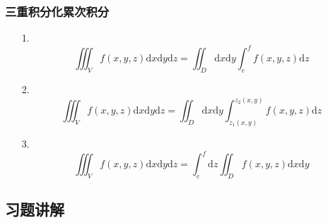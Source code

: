\documentclass[xetex]{beamer}
\begin{document}
	\begin{frame}
		\frametitle{三重积分化累次积分}
		\begin{itemize}
			\item[1.] 
				\begin{equation*}
					\iiint_{V} f(x,y,z)\mathrm{d} x \mathrm{d} y\mathrm{d} z = \iint_D \mathrm{d}x \mathrm{d} y \int_{e}^{f} f(x,y,z) \mathrm{d} z
				\end{equation*}
			\item[2.]
				\begin{equation*}
					\iiint_{V} f(x,y,z)\mathrm{d} x \mathrm{d} y\mathrm{d} z = \iint_D \mathrm{d}x \mathrm{d} y \int_{z_1(x, y)}^{z_2(x, y)} f(x,y,z) \mathrm{d} z
				\end{equation*}
			\item[3.]
				\begin{equation*}
					\iiint_{V} f(x,y,z)\mathrm{d} x \mathrm{d} y\mathrm{d} z = \int_{e}^{f} \mathrm{d} z \iint_D f(x,y,z) \mathrm{d}x \mathrm{d} y 
				\end{equation*}
		\end{itemize}
	\end{frame}
	
	
	\begin{frame}
		\section{习题讲解}
	\end{frame}
	
\end{document}

